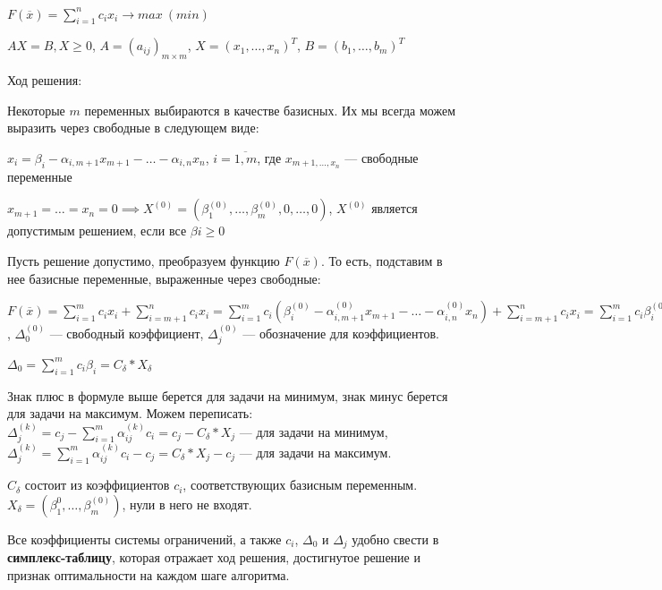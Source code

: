 \documentclass{article}
\begin{document}
$F(\overline{x}) = \sum\limits_{i = 1}^{n} c_i x_i \to max \ (min)$

$AX = B, X \ge 0$, $A = (a_{i j})_{m \times m}$, $X = (x_1, \dots, x_{n})^{T}$, $B = (b_1, \dots, b_{m})^{T}$

Ход решения:

Некоторые $m$ переменных выбираются в качестве базисных. Их мы всегда можем выразить через свободные в следующем виде:
    
$x_{i} = \beta_{i} - \alpha_{i, m + 1} x_{m + 1} - \dots - \alpha_{i, n} x_{n}$, $i = \overline{1, m}$, где $x_{m + 1, \dots, x_{n}}$ — свободные переменные

$x_{m + 1} = \dots = x_{n} = 0 \implies X^{(0)} = (\beta_1^{(0)}, \dots, \beta_{m}^{(0)}, 0, \dots, 0)$, $X^{(0)}$ является допустимым решением, если все $\beta{i} \ge 0$

Пусть решение допустимо, преобразуем функцию $F(\overline{x})$. То есть, подставим в нее базисные переменные, выраженные через свободные:

$F(\overline{x}) = \sum\limits_{i = 1}^{m} c_{i} x_{i} + \sum\limits_{i = m + 1}^{n} c_{i} x_{i} = \sum\limits_{i = 1}^{m} c_i (\beta_i^{(0)} - \alpha^{(0)}_{i, m + 1} x_{m + 1} - \dots - \alpha^{(0)}_{i, n} x_{n}) + \sum\limits_{i = m + 1}^{n} c_i x_i = \sum\limits_{i = 1}^{m} c_i \beta_i^{(0)} + \sum\limits_{j = m + 1}^{n} (c_j - \sum\limits_{i = 1}^{m} a_{i, j}^{(0)} c_{i}) x_j = \Delta_0^{(0)} \pm \sum\limits_{j = m + 1}^{n} \Delta_{j}^{(0)} x_{j}$, $\Delta_{0}^{(0)}$ — свободный коэффициент, $\Delta_{j}^{(0)}$ — обозначение для коэффициентов.

$\Delta_{0} = \sum\limits_{i = 1}^{m} c_{i} \beta_{i} = C_{\delta} * X_{\delta}$

Знак плюс в формуле выше берется для задачи на минимум, знак минус берется для задачи на максимум. Можем переписать: $\Delta_{j}^{(k)} = c_{j} - \sum\limits_{i = 1}^{m} \alpha_{i j}^{(k)} c_{i} = c_{j} - C_{\delta} * X_{j}$ — для задачи на минимум, $\Delta_{j}^{(k)} = \sum\limits_{i = 1}^{m} \alpha_{i j}^{(k)} c_{i} - c_{j}  = C_{\delta} * X_{j} - c_{j}$ — для задачи на максимум.

$C_{\delta}$ состоит из коэффициентов $c_{i}$, соответствующих базисным переменным. $X_{\delta} = (\beta_{1}^{0}, \dots, \beta_{m}^{(0)})$, нули в него не входят.

Все коэффициенты системы ограничений, а также $c_{i}$, $\Delta_0$ и $\Delta_{j}$ удобно свести в \textbf{симплекс-таблицу}, которая отражает ход решения, достигнутое решение и признак оптимальности на каждом шаге алгоритма.
\end{document}
